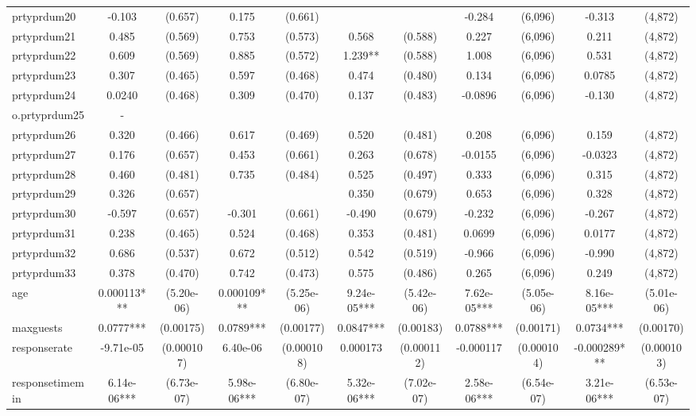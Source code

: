 \documentclass[]{article}
\begin{document}
\begin{tabular}{lcccccccccc}
prtyprdum20 & -0.103 & (0.657) & 0.175 & (0.661) &  &  & -0.284 & (6,096) & -0.313 & (4,872) \\
prtyprdum21 & 0.485 & (0.569) & 0.753 & (0.573) & 0.568 & (0.588) & 0.227 & (6,096) & 0.211 & (4,872) \\
prtyprdum22 & 0.609 & (0.569) & 0.885 & (0.572) & 1.239** & (0.588) & 1.008 & (6,096) & 0.531 & (4,872) \\
prtyprdum23 & 0.307 & (0.465) & 0.597 & (0.468) & 0.474 & (0.480) & 0.134 & (6,096) & 0.0785 & (4,872) \\
prtyprdum24 & 0.0240 & (0.468) & 0.309 & (0.470) & 0.137 & (0.483) & -0.0896 & (6,096) & -0.130 & (4,872) \\
o.prtyprdum25 & - &  &  &  &  &  &  &  &  &  \\
prtyprdum26 & 0.320 & (0.466) & 0.617 & (0.469) & 0.520 & (0.481) & 0.208 & (6,096) & 0.159 & (4,872) \\
prtyprdum27 & 0.176 & (0.657) & 0.453 & (0.661) & 0.263 & (0.678) & -0.0155 & (6,096) & -0.0323 & (4,872) \\
prtyprdum28 & 0.460 & (0.481) & 0.735 & (0.484) & 0.525 & (0.497) & 0.333 & (6,096) & 0.315 & (4,872) \\
prtyprdum29 & 0.326 & (0.657) &  &  & 0.350 & (0.679) & 0.653 & (6,096) & 0.328 & (4,872) \\
prtyprdum30 & -0.597 & (0.657) & -0.301 & (0.661) & -0.490 & (0.679) & -0.232 & (6,096) & -0.267 & (4,872) \\
prtyprdum31 & 0.238 & (0.465) & 0.524 & (0.468) & 0.353 & (0.481) & 0.0699 & (6,096) & 0.0177 & (4,872) \\
prtyprdum32 & 0.686 & (0.537) & 0.672 & (0.512) & 0.542 & (0.519) & -0.966 & (6,096) & -0.990 & (4,872) \\
prtyprdum33 & 0.378 & (0.470) & 0.742 & (0.473) & 0.575 & (0.486) & 0.265 & (6,096) & 0.249 & (4,872) \\
age & 0.000113*** & (5.20e-06) & 0.000109*** & (5.25e-06) & 9.24e-05*** & (5.42e-06) & 7.62e-05*** & (5.05e-06) & 8.16e-05*** & (5.01e-06) \\
maxguests & 0.0777*** & (0.00175) & 0.0789*** & (0.00177) & 0.0847*** & (0.00183) & 0.0788*** & (0.00171) & 0.0734*** & (0.00170) \\
responserate & -9.71e-05 & (0.000107) & 6.40e-06 & (0.000108) & 0.000173 & (0.000112) & -0.000117 & (0.000104) & -0.000289*** & (0.000103) \\
responsetimemin & 6.14e-06*** & (6.73e-07) & 5.98e-06*** & (6.80e-07) & 5.32e-06*** & (7.02e-07) & 2.58e-06*** & (6.54e-07) & 3.21e-06*** & (6.53e-07) \\

\end{tabular}
\end{document}
